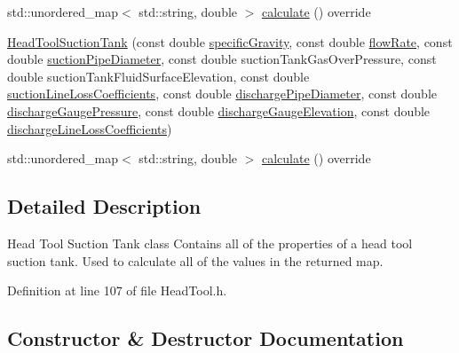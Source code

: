 \begin{DoxyCompactItemize}
\item 
std\+::unordered\+\_\+map$<$ std\+::string, double $>$ \hyperlink{class_head_tool_suction_tank_a7e4a6931caa7c9be43992aecdfb80bec}{calculate} () override
\item 
\hyperlink{class_head_tool_suction_tank_a96579ecd414c723362db00cfeb24cd46}{Head\+Tool\+Suction\+Tank} (const double \hyperlink{class_head_tool_base_ae5af2380fb5db2c25281ef663a5fb65f}{specific\+Gravity}, const double \hyperlink{class_head_tool_base_acf4c03cb62cbf63aba017ce063989fbc}{flow\+Rate}, const double \hyperlink{class_head_tool_base_a357365fc5ef346ce7bcb089c9d1a95e1}{suction\+Pipe\+Diameter}, const double suction\+Tank\+Gas\+Over\+Pressure, const double suction\+Tank\+Fluid\+Surface\+Elevation, const double \hyperlink{class_head_tool_base_ac74c6f6f8ab387efe7b77e0ce6ecd84e}{suction\+Line\+Loss\+Coefficients}, const double \hyperlink{class_head_tool_base_a126a397bd3d87b68864e1962c70bb45e}{discharge\+Pipe\+Diameter}, const double \hyperlink{class_head_tool_base_a39c854f13b16967e02a67cd1aaee07c4}{discharge\+Gauge\+Pressure}, const double \hyperlink{class_head_tool_base_a9ed2160992f8da2e335d919cf9aedd08}{discharge\+Gauge\+Elevation}, const double \hyperlink{class_head_tool_base_a147c035c7422406c594c5fd42ab11eb0}{discharge\+Line\+Loss\+Coefficients})
\item 
std\+::unordered\+\_\+map$<$ std\+::string, double $>$ \hyperlink{class_head_tool_suction_tank_a7e4a6931caa7c9be43992aecdfb80bec}{calculate} () override
\end{DoxyCompactItemize}


\subsection{Detailed Description}
Head Tool Suction Tank class Contains all of the properties of a head tool suction tank. Used to calculate all of the values in the returned map. 

Definition at line 107 of file Head\+Tool.\+h.



\subsection{Constructor \& Destructor Documentation}
\mbox{\label{class_head_tool_suction_tank_a96579ecd414c723362db00cfeb24cd46}} 
